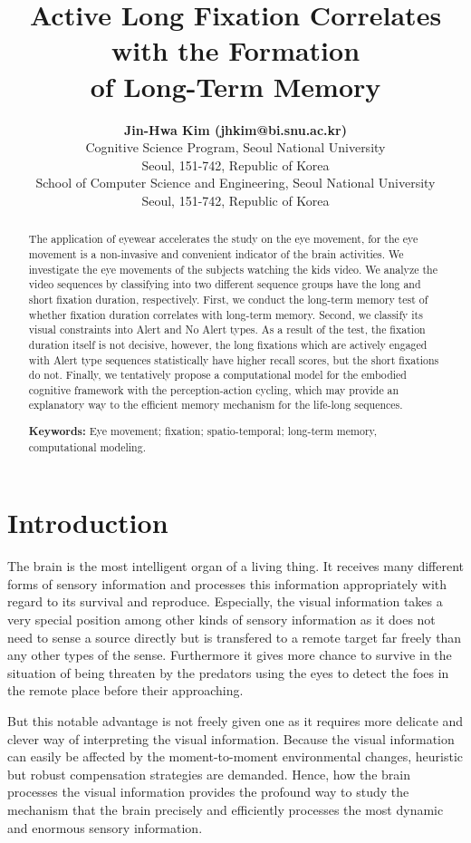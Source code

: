 \documentclass[10pt,letterpaper]{article}
\title{Active Long Fixation Correlates with the Formation \\
of Long-Term Memory}
\author{{\large \bf Jin-Hwa Kim (jhkim@bi.snu.ac.kr)} \\
  Cognitive Science Program, Seoul National University \\
  Seoul, 151-742, Republic of Korea
  \AND {\large \bf Byoung-Tak Zhang (btzhang@bi.snu.ac.kr)} \\
  School of Computer Science and Engineering, Seoul National University \\
  Seoul, 151-742, Republic of Korea}
\begin{document}
\maketitle

\begin{abstract}
The application of eyewear accelerates the study on the eye movement, for the eye movement is a non-invasive and convenient indicator of the brain activities. We investigate the eye movements of the subjects watching the kids video. We analyze the video sequences by classifying into two different sequence groups have the long and short fixation duration, respectively. First, we conduct the long-term memory test of whether fixation duration correlates with long-term memory. Second, we classify its visual constraints into Alert and No Alert types. As a result of the test, the fixation duration itself is not decisive, however, the long fixations which are actively engaged with Alert type sequences statistically have higher recall scores, but the short fixations do not. Finally, we tentatively propose a computational model for the embodied cognitive framework with the perception-action cycling, which may provide an explanatory way to the efficient memory mechanism for the life-long sequences.

\textbf{Keywords:} 
Eye movement; fixation; spatio-temporal; long-term memory, computational modeling.
\end{abstract}



\section{Introduction}

The brain is the most intelligent organ of a living thing. It receives many different forms of sensory information and processes this information appropriately with regard to its survival and reproduce. Especially, the visual information takes a very special position among other kinds of sensory information as it does not need to sense a source directly but is transfered to a remote target far freely than any other types of the sense. Furthermore it gives more chance to survive in the situation of being threaten by the predators using the eyes to detect the foes in the remote place before their approaching. 

But this notable advantage is not freely given one as it requires more delicate and clever way of interpreting the visual information. Because the visual information can easily be affected by the moment-to-moment environmental changes, heuristic but robust compensation strategies are demanded. Hence, how the brain processes the visual information provides the profound way to study the mechanism that the brain precisely and efficiently processes the most dynamic and enormous sensory information.
\end{document}
